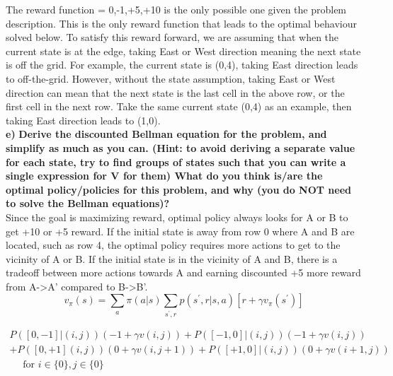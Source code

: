 \documentclass[11pt]{article}
\begin{document}
\noindent
The reward function = {0,-1,+5,+10} is the only possible one given the problem
description. This is the only reward function that leads to the optimal
behaviour solved below. To satisfy this reward forward, we are assuming that
when the current state is at the edge, taking East or West direction meaning the
next state is off the grid. For example, the current state is (0,4), taking East
direction leads to off-the-grid. However, without the state assumption, taking
East or West direction can mean that the next state is the last cell in the
above row, or the first cell in the next row. Take the same current state (0,4)
as an example, then taking East direction leads to (1,0). 
\\

\noindent
\textbf{e)}
\noindent
\textbf{Derive the discounted Bellman equation for the problem, and simplify
as much as you can. (Hint: to avoid deriving a separate value for each state,
try to find groups of states such that you can write a single expression for V for
them) What do you think is/are the optimal policy/policies for this problem,
and why (you do NOT need to solve the Bellman equations)?}
\\

\noindent
Since the goal is maximizing reward, optimal policy always looks for A or B to
get +10 or +5 reward. If the initial state is away from row 0 where A and B are
located, such as row 4, the optimal policy requires more actions to get to the
vicinity of A or B. If the initial state is in the vicinity of A and B, there is
a tradeoff between more actions towards A and earning discounted +5 more reward
from A->A’ compared to B->B’.
\\


\begin{equation}
v_{\pi}(s)=\sum_{a} \pi(a | s) \sum_{s^{\prime}, r} p\left(s^{\prime}, r | s, a\right)\left[r+\gamma v_{\pi}\left(s^{\prime}\right)\right]
\end{equation}



\begin{equation}
\begin{array}{c}
{P([0,-1] |(i, j))(-1+\gamma v(i, j))+P([-1,0] |(i, j))(-1+\gamma v(i, j))} \\
{+P([0,+1](i, j))(0+\gamma v(i, j+1))+P([+1, 0] |(i, j))(0+\gamma v(i+1, j))} \\
{\quad \text { for } i \in\{0\}, j \in\{0\}}
\end{array}
\end{equation}
\end{document}
